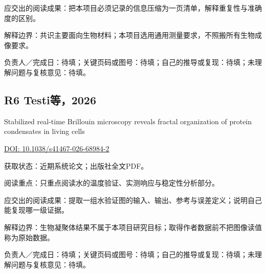 \documentclass[UTF8,a4paper,11pt,fontset=fandol]{ctexart}
\begin{document}
应交出的阅读成果：把本项目必须记录的信息压缩为一页清单，解释重复性与准确度的区别。

解释边界：共识主要面向生物材料；本项目选用通用测量要求，不照搬所有生物成像要求。

负责人／完成日：待填；关键页码或图号：待填；自己的推导或复现：待填；未理解问题与复核意见：待填。

\subsection*{R6 Testi等，2026}
Stabilized real-time Brillouin microscopy reveals fractal organization of protein condensates in living cells

\noindent\href{https://doi.org/10.1038/s41467-026-68984-2}{DOI: 10.1038/s41467-026-68984-2}\par\smallskip
获取状态：近期系统论文；出版社全文PDF。

阅读重点：只重点阅读水的温度验证、实测响应与稳定性分析部分。

应交出的阅读成果：提取一组水验证图的输入、输出、参考与误差定义；说明自己能复现哪一级证据。

解释边界：生物凝聚体结果不属于本项目研究目标；取得作者数据前不把图像读值称为原始数据。

负责人／完成日：待填；关键页码或图号：待填；自己的推导或复现：待填；未理解问题与复核意见：待填。
\end{document}
